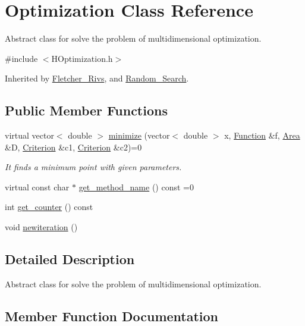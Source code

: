 \hypertarget{class_optimization}{}\section{Optimization Class Reference}
\label{class_optimization}


Abstract class for solve the problem of multidimensional optimization.  




{\ttfamily \#include $<$H\+Optimization.\+h$>$}



Inherited by \hyperlink{class_fletcher___rivs}{Fletcher\+\_\+\+Rivs}, and \hyperlink{class_random___search}{Random\+\_\+\+Search}.

\subsection*{Public Member Functions}
\begin{DoxyCompactItemize}
\item 
virtual vector$<$ double $>$ \hyperlink{class_optimization_afbcc2bddcaf625671385b2e2d77fc038}{minimize} (vector$<$ double $>$ x, \hyperlink{class_function}{Function} \&f, \hyperlink{class_area}{Area} \&D, \hyperlink{class_criterion}{Criterion} \&c1, \hyperlink{class_criterion}{Criterion} \&c2)=0
\begin{DoxyCompactList}\small\item\em It finds a minimum point with given parameters. \end{DoxyCompactList}\item 
virtual const char $\ast$ \hyperlink{class_optimization_a7d4cf7e7c0d0726822e6e29adecbd252}{get\+\_\+method\+\_\+name} () const =0
\item 
int \hyperlink{class_optimization_a248956fcbe43e3766423f287553c2c6f}{get\+\_\+counter} () const
\item 
void \hyperlink{class_optimization_abafd547d745bc790f7f1ca91097f4257}{newiteration} ()
\end{DoxyCompactItemize}


\subsection{Detailed Description}
Abstract class for solve the problem of multidimensional optimization. 

\subsection{Member Function Documentation}
\mbox{\label{class_optimization_a248956fcbe43e3766423f287553c2c6f}} 
